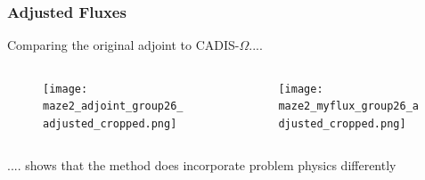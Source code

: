 \documentclass[handout]{beamer}
\renewcommand{\(}{\begin{columns}}
\renewcommand{\)}{\end{columns}}
\newcommand{\<}[1]{\begin{column}{#1}}
\renewcommand{\>}{\end{column}}
\begin{document}
\begin{frame}[fragile]
  \frametitle{Adjusted Fluxes}


	Comparing the original adjoint to CADIS-$\Omega$....
	\vspace*{1 em}
	\begin{columns}
  	\begin{column}{0.5\textwidth}
  	\begin{figure}
  	\begin{center}
  		\texttt{[image: maze2\_adjoint\_group26\_adjusted\_cropped.png]}
	\end{center}
  	\end{figure}
  	\end{column}
 	\begin{column}{0.5\textwidth}
 	\begin{figure}
  	\begin{center}
  		\texttt{[image: maze2\_myflux\_group26\_adjusted\_cropped.png]}
  	\end{center}
  	\end{figure}
  	\end{column}
	\end{columns}
	\vspace*{1 em}
	.... shows that the method does incorporate problem physics differently
  
	
\end{frame}
\end{document}
